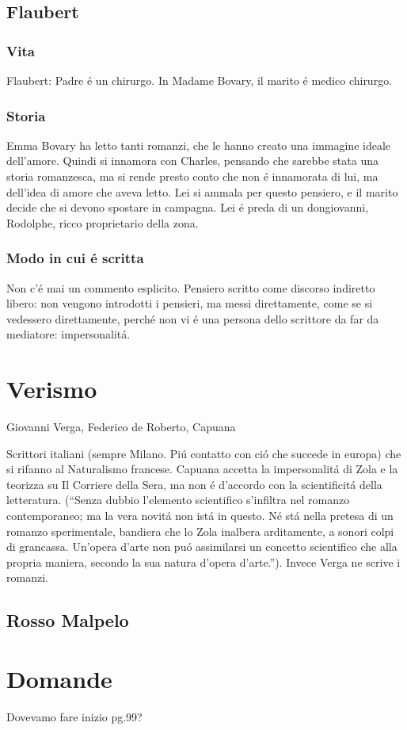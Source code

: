 \documentclass{article}
\begin{document}
\subsection{Flaubert}
\subsubsection{Vita}
Flaubert: Padre é un chirurgo. In Madame Bovary, il marito é medico chirurgo.
\subsubsection{Storia}
Emma Bovary ha letto tanti romanzi, che le hanno creato una immagine ideale dell'amore. Quindi si innamora con Charles, pensando che sarebbe stata una storia romanzesca, ma si rende presto conto che non é innamorata di lui, ma dell'idea di amore che aveva letto. Lei si ammala per questo pensiero, e il marito decide che si devono spostare in campagna. Lei é preda di un dongiovanni, Rodolphe, ricco proprietario della zona.
\subsubsection{Modo in cui é scritta}
Non c'é mai un commento esplicito. Pensiero scritto come discorso indiretto libero: non vengono introdotti i pensieri, ma messi direttamente, come se si vedessero direttamente, perché non vi é una persona dello scrittore da far da mediatore: impersonalitá.
\section{Verismo}
Giovanni Verga, Federico de Roberto, Capuana

Scrittori italiani (sempre Milano. Piú contatto con ció che succede in europa) che si rifanno al Naturalismo francese. Capuana accetta la impersonalitá di Zola e la teorizza su Il Corriere della Sera, ma non é d'accordo con la scientificitá della letteratura. (``Senza dubbio l'elemento scientifico s'infiltra nel romanzo contemporaneo; ma la vera novitá non istá in questo. Né stá nella pretesa di un romanzo sperimentale, bandiera che lo Zola inalbera arditamente, a sonori colpi di grancassa. Un'opera d'arte non puó assimilarsi un concetto scientifico che alla propria maniera, secondo la sua natura d'opera d'arte.''). Invece Verga ne scrive i romanzi.

\subsection{Rosso Malpelo}

\section{Domande}
Dovevamo fare inizio pg.99?
\end{document}
